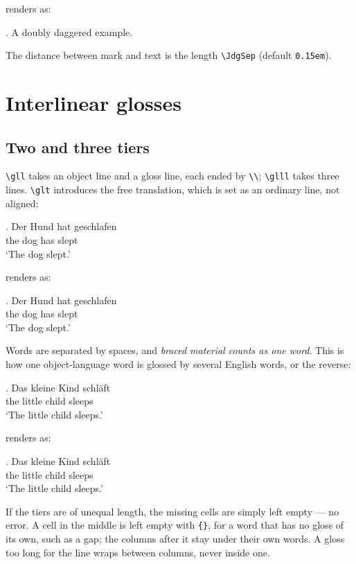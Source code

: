 \documentclass[11pt,a4paper]{article}
\newcommand{\cs}[1]{\texttt{\textbackslash #1}}
\newcommand{\rendered}{\par\medskip\noindent\textcolor{gray!70}{\small renders as:}\par\nobreak\smallskip}
\newcommand{\afterex}{\par\addvspace{\medskipamount}}
\begin{document}
\rendered
{\DeclareJudgment{\dubious}{\dag\dag}%
\ex. \dubious A doubly daggered example.

}

\afterex
The distance between mark and text is the length \cs{JdgSep}
(default \texttt{0.15em}).


\section{Interlinear glosses}\label{sec:glosses}

\subsection{Two and three tiers}

\cs{gll} takes an object line and a gloss line, each ended by \verb|\\|;
\cs{glll} takes three lines. \cs{glt} introduces the free translation,
which is set as an ordinary line, not aligned:

\begin{code}
\ex. \gll Der Hund hat geschlafen \\
          the dog  has slept      \\
\glt `The dog slept.'
\end{code}

\rendered
\ex. \gll Der Hund hat geschlafen \\
     the dog has slept \\
\glt `The dog slept.'

\afterex
Words are separated by spaces, and \emph{braced material counts as one
word}. This is how one object-language word is glossed by several English
words, or the reverse:

\begin{code}
\ex. \gll Das {kleine Kind} schläft \\
          the {little child} sleeps   \\
\glt `The little child sleeps.'
\end{code}

\rendered
\ex. \gll Das {kleine Kind} schläft \\
     the {little child} sleeps \\
\glt `The little child sleeps.'

\afterex
If the tiers are of unequal length, the missing cells are simply left
empty --- no error. A cell in the middle is left empty with \verb|{}|, for a
word that has no gloss of its own, such as a gap; the columns after it stay
under their own words. A gloss too long for the line wraps between columns,
never inside one.
\end{document}
